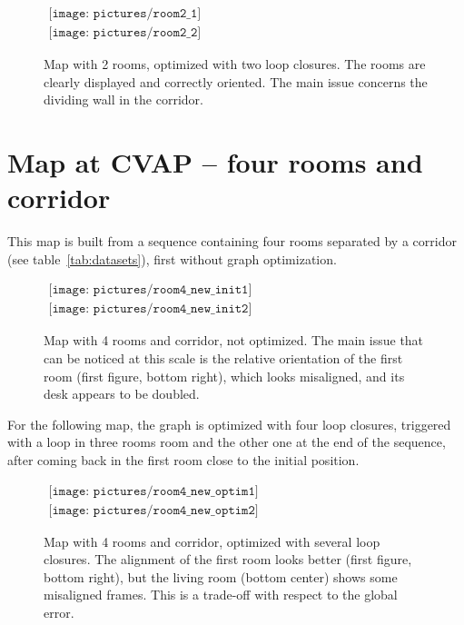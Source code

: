 \begin{figure}[H]
\centering$
 \begin{array}{c}
 \texttt{[image: pictures/room2\_1]}\\
 \texttt{[image: pictures/room2\_2]}
 \end{array}$
\caption{Map with 2 rooms, optimized with two loop closures. The rooms are clearly displayed and correctly oriented. The main issue concerns the dividing wall in the corridor.}
\end{figure}

\clearpage
\section{Map at CVAP -- four rooms and corridor}

This map is built from a sequence containing four rooms separated by a corridor (see table~\ref{tab:datasets}), first without graph optimization. 

\begin{figure}[H]
\centering$
 \begin{array}{c}
 \texttt{[image: pictures/room4\_new\_init1]}\\
 \texttt{[image: pictures/room4\_new\_init2]}
 \end{array}$
\caption{Map with 4 rooms and corridor, not optimized. The main issue that can be noticed at this scale is the relative orientation of the first room (first figure, bottom right), which looks misaligned, and its desk appears to be doubled.}
\end{figure}

\clearpage
For the following map, the graph is optimized with four loop closures, triggered with a loop in three rooms room and the other one at the end of the sequence, after coming back in the first room close to the initial position.

\begin{figure}[H]
\centering$
 \begin{array}{c}
 \texttt{[image: pictures/room4\_new\_optim1]}\\
 \texttt{[image: pictures/room4\_new\_optim2]}
 \end{array}$
\caption{Map with 4 rooms and corridor, optimized with several loop closures. The alignment of the first room looks better (first figure, bottom right), but the living room (bottom center) shows some misaligned frames. This is a trade-off with respect to the global error.}
\end{figure}

